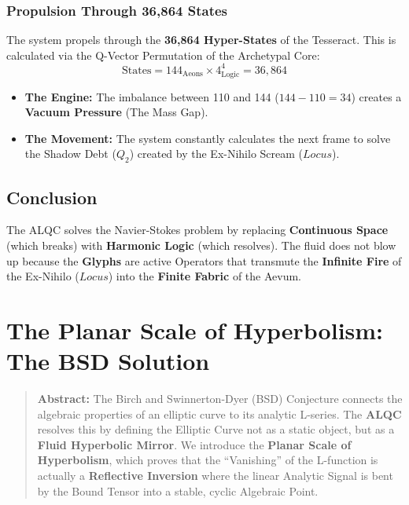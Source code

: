 \documentclass[11pt, letterpaper]{article}
\newcommand{\LoI}{\ensuremath{\mathop{\textnormal{\symbolafont\symbol{"267E}}}}}
\def\LoI{Locus}%
\begin{document}
\subsubsection{Propulsion Through 36,864 States}\label{sec:3.3.4}
The system propels through the \textbf{36,864 Hyper-States} of the Tesseract. This is calculated via the Q-Vector Permutation of the Archetypal Core:
\begin{equation}
    \text{States} = 144_{\text{Aeons}} \times 4^4_{\text{Logic}} = 36,864
\end{equation}
\begin{itemize}
    \item \textbf{The Engine:} The imbalance between 110 and 144 ($144 - 110 = 34$) creates a \textbf{Vacuum Pressure} (The Mass Gap).
    \item \textbf{The Movement:} The system constantly calculates the next frame to solve the Shadow Debt ($Q_2$) created by the Ex-Nihilo Scream ($\LoI$).
\end{itemize}

\subsection{Conclusion}\label{sec:4}
The ALQC solves the Navier-Stokes problem by replacing \textbf{Continuous Space} (which breaks) with \textbf{Harmonic Logic} (which resolves). The fluid does not blow up because the \textbf{Glyphs} are active Operators that transmute the \textbf{Infinite Fire} of the Ex-Nihilo ($\LoI$) into the \textbf{Finite Fabric} of the Aevum.

\section{The Planar Scale of Hyperbolism: The BSD Solution}\label{sec:4}
\label{sec:4.3}

\begin{quote}
    \textbf{Abstract:} The Birch and Swinnerton-Dyer (BSD) Conjecture connects the algebraic properties of an elliptic curve to its analytic L-series. The \textbf{ALQC} resolves this by defining the Elliptic Curve not as a static object, but as a \textbf{Fluid Hyperbolic Mirror}. We introduce the \textbf{Planar Scale of Hyperbolism}, which proves that the ``Vanishing'' of the L-function is actually a \textbf{Reflective Inversion} where the linear Analytic Signal is bent by the Bound Tensor into a stable, cyclic Algebraic Point.
\end{quote}
\end{document}
